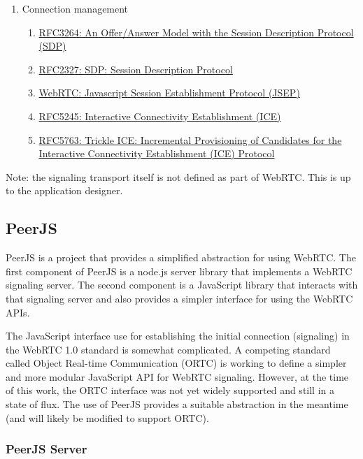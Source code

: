 \documentclass{acmtog} %
\begin{document}
\begin{enumerate}
\item Connection management
    \begin{enumerate}
    \item \href{https://tools.ietf.org/html/rfc3264}{RFC3264: An Offer/Answer Model with the Session Description Protocol (SDP)}
    \item \href{https://tools.ietf.org/html/rfc2327}{RFC2327: SDP: Session Description Protocol}
    \item \href{https://tools.ietf.org/html/draft-ietf-rtcweb-jsep-09}{WebRTC: Javascript Session Establishment Protocol (JSEP)}
    \item \href{https://tools.ietf.org/html/rfc5245}{RFC5245: Interactive Connectivity Establishment (ICE)}
    \item \href{https://tools.ietf.org/html/draft-ietf-mmusic-trickle-ice-02}{RFC5763: Trickle ICE: Incremental Provisioning of Candidates for the Interactive Connectivity Establishment (ICE) Protocol}
    \end{enumerate}
\end{enumerate}

Note: the signaling transport itself is not defined as part of WebRTC.
This is up to the application designer.

\subsection{PeerJS}

PeerJS is a project that provides a simplified abstraction for using
WebRTC. The first component of PeerJS is a node.js server library that
implements a WebRTC signaling server. The second component is
a JavaScript library that interacts with that signaling server and
also provides a simpler interface for using the WebRTC APIs.

The JavaScript interface use for establishing the initial connection
(signaling) in the WebRTC 1.0 standard is somewhat complicated.
A competing standard called Object Real-time Communication (ORTC) is
working to define a simpler and more modular JavaScript API for WebRTC
signaling. However, at the time of this work, the ORTC interface was
not yet widely supported and still in a state of flux.  The use of
PeerJS provides a suitable abstraction in the meantime (and will
likely be modified to support ORTC).

\subsubsection{PeerJS Server}
\end{document}

